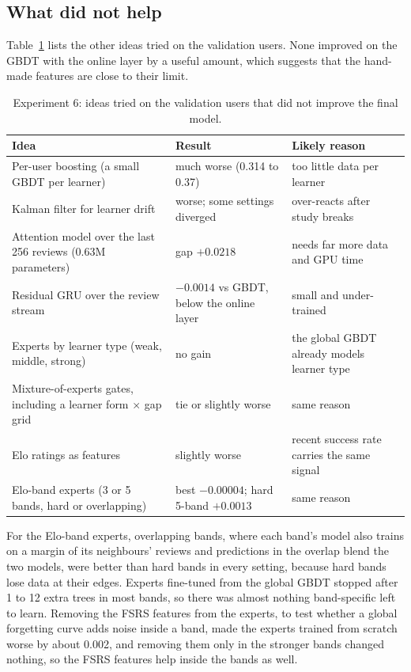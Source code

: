 \subsection{What did not help}
\label{sec:results-exp6-negative}

Table~\ref{tab:exp6-negative} lists the other ideas tried on the validation users. None improved on the GBDT with the online
layer by a useful amount, which suggests that the hand-made features are close to their limit.

\begin{table}[htbp]
  \centering
  \caption[Experiment 6: ideas that did not help]{Experiment 6: ideas tried on the validation users that did not improve the final model.}
  \label{tab:exp6-negative}
  \begin{tabular}{@{}p{5.6cm}p{4.4cm}p{4.2cm}@{}}
    \toprule
    Idea & Result & Likely reason \\
    \midrule
    Per-user boosting (a small GBDT per learner) & much worse (0.314 to 0.37) & too little data per learner \\
    Kalman filter for learner drift & worse; some settings diverged & over-reacts after study breaks \\
    Attention model over the last 256 reviews (0.63M parameters) & gap $+0.0218$ & needs far more data and GPU time \\
    Residual GRU over the review stream & $-0.0014$ vs GBDT, below the online layer & small and under-trained \\
    Experts by learner type (weak, middle, strong) & no gain & the global GBDT already models learner type \\
    Mixture-of-experts gates, including a learner form $\times$ gap grid & tie or slightly worse & same reason \\
    Elo ratings as features & slightly worse & recent success rate carries the same signal \\
    Elo-band experts (3 or 5 bands, hard or overlapping) & best $-0.00004$; hard 5-band $+0.0013$ & same reason \\
    \bottomrule
  \end{tabular}
\end{table}

For the Elo-band experts, overlapping bands, where each band's model also trains on a margin of its neighbours' reviews and
predictions in the overlap blend the two models, were better than hard bands in every setting, because hard bands lose data at
their edges. Experts fine-tuned from the global GBDT stopped after 1 to 12 extra trees in most bands, so there was almost
nothing band-specific left to learn. Removing the FSRS features from the experts, to test whether a global forgetting curve adds noise inside a band, made the experts trained from scratch worse by about 0.002, and removing them only in the stronger bands changed nothing, so the FSRS features help inside the bands as well.

